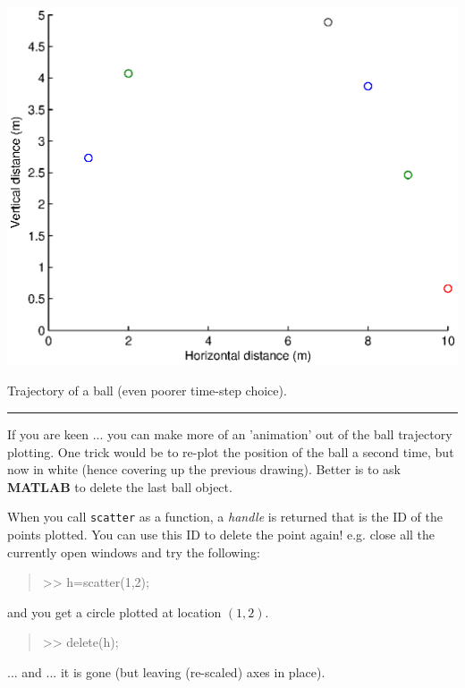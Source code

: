 \documentclass{tufte-book} %
\newenvironment{docspec}{\begin{quotation}\ttfamily\parskip0pt\parindent0pt\ignorespaces}{\end{quotation}}
\begin{document}
\begin{marginfigure}[-0.0in]
\includegraphics[width=\linewidth]{ch9-ball_uv3.eps}
\caption{Trajectory of a ball (even poorer time-step choice).}
\label{fig:ch9-ball_uv3}
\end{marginfigure}

\vspace{1mm}
\noindent\rule{4cm}{0.5pt}
\vspace{2mm}

\noindent If you are keen ... you can make more of an 'animation' out of the ball trajectory plotting. One trick would be to re-plot the position of the ball a second time, but now in white (hence covering up the previous drawing). Better is to ask \textbf{MATLAB} to delete the last ball object.

When you call \texttt{scatter} as a function, a \textit{handle} is returned that is the ID of the points plotted. You can use this ID to delete the point again! e.g. close all the currently open windows and try the following:
\begin{docspec}
>> h=scatter(1,2);
\end{docspec}
and you get a circle plotted at location \((1,2)\).
\begin{docspec}
>> delete(h);
\end{docspec}
... and ... it is gone (but leaving (re-scaled) axes in place).
\end{document}

